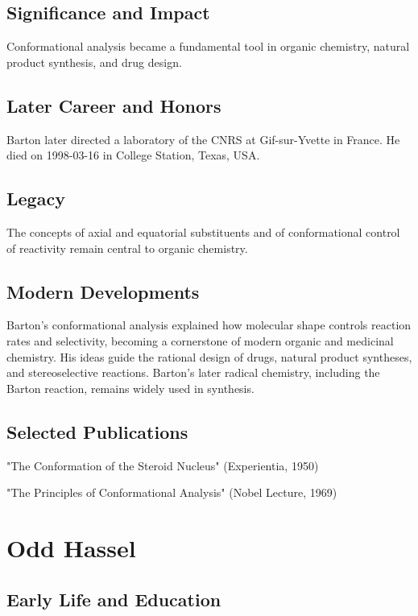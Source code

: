 \subsection*{Significance and Impact}

Conformational analysis became a fundamental tool in organic chemistry, natural product synthesis, and drug design.

\subsection*{Later Career and Honors}

Barton later directed a laboratory of the CNRS at Gif-sur-Yvette in France. He died on 1998-03-16 in College Station, Texas, USA.

\subsection*{Legacy}

The concepts of axial and equatorial substituents and of conformational control of reactivity remain central to organic chemistry.

\subsection*{Modern Developments}

Barton's conformational analysis explained how molecular shape controls reaction rates and selectivity, becoming a cornerstone of modern organic and medicinal chemistry. His ideas guide the rational design of drugs, natural product syntheses, and stereoselective reactions. Barton's later radical chemistry, including the Barton reaction, remains widely used in synthesis.

\subsection*{Selected Publications}

"The Conformation of the Steroid Nucleus" (Experientia, 1950)

"The Principles of Conformational Analysis" (Nobel Lecture, 1969)

\clearpage

\section{Odd Hassel}

\subsection*{Early Life and Education}

